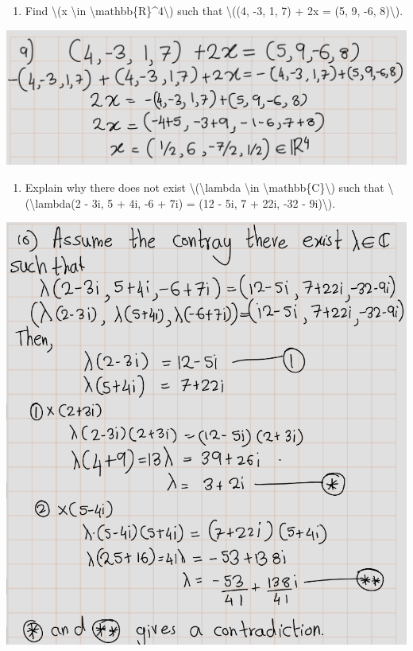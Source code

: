 \documentclass[
]{book}
\providecommand{\tightlist}{%
  \setlength{\itemsep}{0pt}\setlength{\parskip}{0pt}}
\theoremstyle{definition}
\theoremstyle{definition}
\theoremstyle{definition}
\theoremstyle{definition}
\theoremstyle{remark}
\begin{document}
\begin{enumerate}
\def\labelenumi{\arabic{enumi}.}
\setcounter{enumi}{8}
\tightlist
\item
  Find \textbackslash(x \textbackslash in \textbackslash mathbb\{R\}\^{}4\textbackslash) such that \textbackslash((4, -3, 1, 7) + 2x = (5, 9, -6, 8)\textbackslash).
\end{enumerate}

\includegraphics{fig/Ex1A/Ex9.png}

\begin{enumerate}
\def\labelenumi{\arabic{enumi}.}
\setcounter{enumi}{9}
\tightlist
\item
  Explain why there does not exist \textbackslash(\textbackslash lambda \textbackslash in \textbackslash mathbb\{C\}\textbackslash) such that \textbackslash(\textbackslash lambda(2 - 3i, 5 + 4i, -6 + 7i) = (12 - 5i, 7 + 22i, -32 - 9i)\textbackslash).
\end{enumerate}

\includegraphics{fig/Ex1A/Ex10.png}
\end{document}
